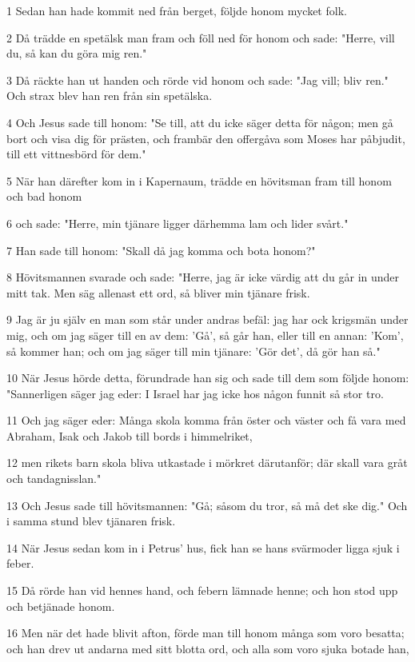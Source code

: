 \par 1 Sedan han hade kommit ned från berget, följde honom mycket folk.
\par 2 Då trädde en spetälsk man fram och föll ned för honom och sade: "Herre, vill du, så kan du göra mig ren."
\par 3 Då räckte han ut handen och rörde vid honom och sade: "Jag vill; bliv ren." Och strax blev han ren från sin spetälska.
\par 4 Och Jesus sade till honom: "Se till, att du icke säger detta för någon; men gå bort och visa dig för prästen, och frambär den offergåva som Moses har påbjudit, till ett vittnesbörd för dem."
\par 5 När han därefter kom in i Kapernaum, trädde en hövitsman fram till honom och bad honom
\par 6 och sade: "Herre, min tjänare ligger därhemma lam och lider svårt."
\par 7 Han sade till honom: "Skall då jag komma och bota honom?"
\par 8 Hövitsmannen svarade och sade: "Herre, jag är icke värdig att du går in under mitt tak. Men säg allenast ett ord, så bliver min tjänare frisk.
\par 9 Jag är ju själv en man som står under andras befäl: jag har ock krigsmän under mig, och om jag säger till en av dem: 'Gå', så går han, eller till en annan: 'Kom', så kommer han; och om jag säger till min tjänare: 'Gör det', då gör han så."
\par 10 När Jesus hörde detta, förundrade han sig och sade till dem som följde honom: "Sannerligen säger jag eder: I Israel har jag icke hos någon funnit så stor tro.
\par 11 Och jag säger eder: Många skola komma från öster och väster och få vara med Abraham, Isak och Jakob till bords i himmelriket,
\par 12 men rikets barn skola bliva utkastade i mörkret därutanför; där skall vara gråt och tandagnisslan."
\par 13 Och Jesus sade till hövitsmannen: "Gå; såsom du tror, så må det ske dig." Och i samma stund blev tjänaren frisk.
\par 14 När Jesus sedan kom in i Petrus' hus, fick han se hans svärmoder ligga sjuk i feber.
\par 15 Då rörde han vid hennes hand, och febern lämnade henne; och hon stod upp och betjänade honom.
\par 16 Men när det hade blivit afton, förde man till honom många som voro besatta; och han drev ut andarna med sitt blotta ord, och alla som voro sjuka botade han,
